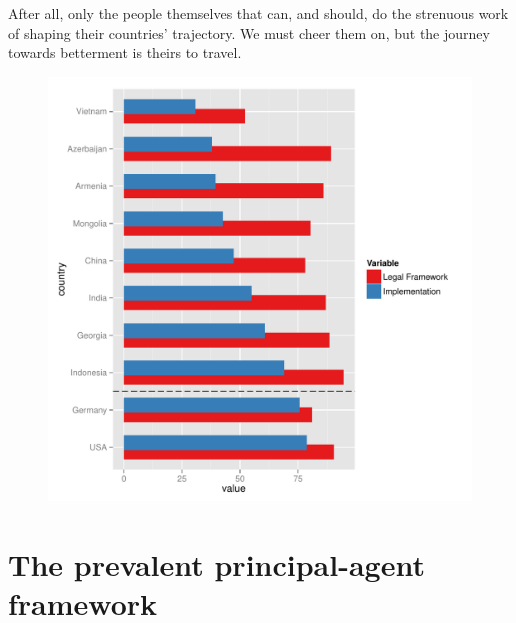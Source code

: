 \documentclass[12pt]{article}
\begin{document}
After all, only the people themselves that can, and should, do the strenuous work of shaping their countries' trajectory. We must cheer them on, but the journey towards betterment is theirs to travel.

\begin{figure}
\begin{center}
\includegraphics[scale=0.6]{implementation}
\end{center}
\end{figure}

\begin{figure}
\begin{center}
\end{center}
\end{figure}

\section{The prevalent principal-agent framework}
\label{sec:principalagent}
\end{document}
